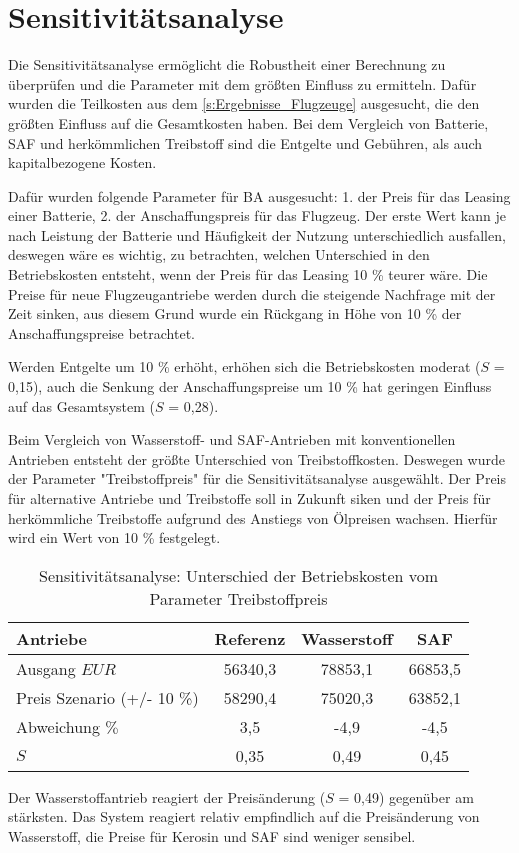 \section{Sensitivitätsanalyse}
\label{s:Sensitivitätsanalyse}
%
Die Sensitivitätsanalyse ermöglicht die Robustheit einer Berechnung zu überprüfen 
und die Parameter mit dem größten Einfluss zu ermitteln. 
Dafür wurden die Teilkosten aus dem \ref{s:Ergebnisse_Flugzeuge} ausgesucht, 
die den größten Einfluss auf die Gesamtkosten haben. 
Bei dem Vergleich von Batterie, SAF und herkömmlichen Treibstoff 
sind die Entgelte und Gebühren, als auch kapitalbezogene Kosten. %

Dafür wurden folgende Parameter für BA ausgesucht: 
1. der Preis für das Leasing einer Batterie, 
2. der Anschaffungspreis für das Flugzeug.
Der erste Wert kann je nach Leistung der Batterie und Häufigkeit der Nutzung unterschiedlich ausfallen, 
deswegen wäre es wichtig, zu betrachten, welchen Unterschied in den Betriebskosten entsteht, 
wenn der Preis für das Leasing 10 \% teurer wäre. 
Die Preise für neue Flugzeugantriebe werden durch die steigende Nachfrage mit der Zeit sinken, 
aus diesem Grund wurde ein Rückgang in Höhe von 10 \% der Anschaffungspreise betrachtet.

Werden Entgelte um 10 \% erhöht, erhöhen sich die Betriebskosten moderat ($S$ = 0,15), 
auch die Senkung der Anschaffungspreise um 10 \% hat geringen Einfluss auf das Gesamtsystem ($S$ = 0,28).

Beim Vergleich von Wasserstoff- und SAF-Antrieben mit konventionellen Antrieben 
entsteht der größte Unterschied von Treibstoffkosten. 
Deswegen wurde der Parameter "Treibstoffpreis" für die Sensitivitätsanalyse ausgewählt.
Der Preis für alternative Antriebe und Treibstoffe soll in Zukunft siken und der Preis 
für herkömmliche Treibstoffe aufgrund des Anstiegs von Ölpreisen wachsen. 
Hierfür wird ein Wert von 10 \% festgelegt.

\begin{table}[h]
	\begin{center}
    \caption{Sensitivitätsanalyse: Unterschied der Betriebskosten vom Parameter Treibstoffpreis}
	\label{BA_Infrastrukturtab}
	\begin{tabular}{|l|c|c|c|}
		\hline
		Antriebe & \textbf{Referenz}& \textbf{Wasserstoff}& \textbf{SAF} \\ \hline
		Ausgang $EUR$ & 56340,3 & 78853,1 & 66853,5  \\ \hline
        Preis Szenario (+/- 10 \%) & 58290,4  & 75020,3 & 63852,1 \\ \hline
        Abweichung $\%$ & 3,5 & -4,9 & -4,5 \\ \hline
		$S$ & 0,35 & 0,49 & 0,45 \\ \hline
	\end{tabular}
    \end{center}
\end{table}

Der Wasserstoffantrieb reagiert der Preisänderung ($S$ = 0,49) gegenüber am stärksten. 
Das System reagiert relativ empfindlich auf die Preisänderung von Wasserstoff, 
die Preise für Kerosin und SAF sind weniger sensibel.
